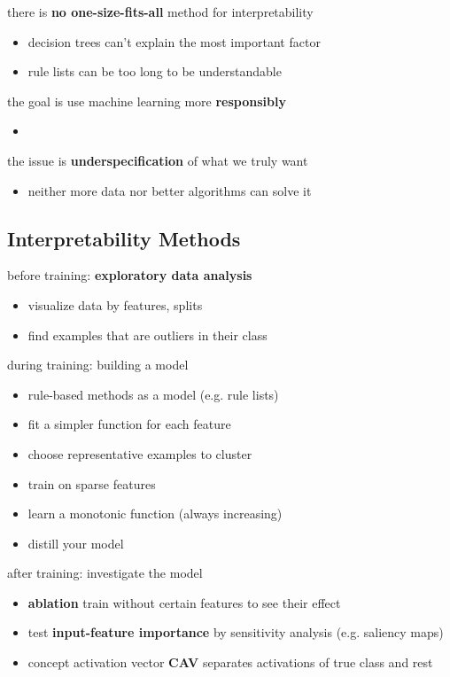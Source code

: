 \documentclass[]{article}
\theoremstyle{definition}
\begin{document}
    there is \textbf{no one-size-fits-all} method for interpretability
    \begin{itemize}
        \item decision trees can't explain the most important factor
        \item rule lists can be too long to be understandable
    \end{itemize}

    the goal is use machine learning more \textbf{responsibly}
    \begin{itemize}
        \item
    \end{itemize}

    the issue is \textbf{underspecification} of what we truly want
    \begin{itemize}
        \item neither more data nor better algorithms can solve it
    \end{itemize}

    \subsection{Interpretability Methods}%
    \label{sub:interpretability_methods}

    before training: \textbf{exploratory data analysis}
    \begin{itemize}
        \item visualize data by features, splits
        \item find examples that are outliers in their class
    \end{itemize}

    during training: building a model
    \begin{itemize}
        \item rule-based methods as a model (e.g. rule lists)
        \item fit a simpler function for each feature
        \item choose representative examples to cluster
        \item train on sparse features
        \item learn a monotonic function (always increasing)
        \item distill your model
    \end{itemize}

    after training: investigate the model
    \begin{itemize}
        \item \textbf{ablation} train without certain features to see their effect
        \item test \textbf{input-feature importance} by sensitivity analysis (e.g. saliency maps)
        \item concept activation vector \textbf{CAV} separates activations of true class and rest
    \end{itemize}
\end{document}
